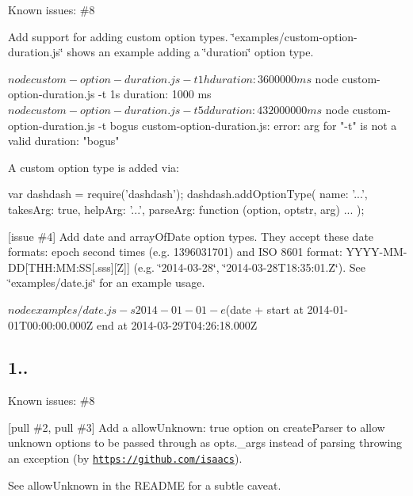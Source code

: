 \begin{DoxyItemize}
\item Known issues\+: \#8
\item Add support for adding custom option types. \char`\"{}examples/custom-\/option-\/duration.\+js\char`\"{} shows an example adding a \char`\"{}duration\char`\"{} option type. \begin{DoxyVerb}  $ node custom-option-duration.js -t 1h
  duration: 3600000 ms
  $ node custom-option-duration.js -t 1s
  duration: 1000 ms
  $ node custom-option-duration.js -t 5d
  duration: 432000000 ms
  $ node custom-option-duration.js -t bogus
  custom-option-duration.js: error: arg for "-t" is not a valid duration: "bogus"
\end{DoxyVerb}


A custom option type is added via\+: \begin{DoxyVerb}  var dashdash = require('dashdash');
  dashdash.addOptionType({
      name: '...',
      takesArg: true,
      helpArg: '...',
      parseArg: function (option, optstr, arg) {
          ...
      }
  });
\end{DoxyVerb}

\item \mbox{[}issue \#4\mbox{]} Add {\ttfamily date} and {\ttfamily array\+Of\+Date} option types. They accept these date formats\+: epoch second times (e.\+g. 1396031701) and I\+SO 8601 format\+: {\ttfamily Y\+Y\+Y\+Y-\/\+M\+M-\/\+DD\mbox{[}T\+H\+H\+:\+MM\+:SS\mbox{[}.sss\mbox{]}\mbox{[}Z\mbox{]}\mbox{]}} (e.\+g. \char`\"{}2014-\/03-\/28\char`\"{}, \char`\"{}2014-\/03-\/28\+T18\+:35\+:01.\+Z\char`\"{}). See \char`\"{}examples/date.\+js\char`\"{} for an example usage. \begin{DoxyVerb}  $ node examples/date.js -s 2014-01-01 -e $(date +%
  start at 2014-01-01T00:00:00.000Z
  end at 2014-03-29T04:26:18.000Z
\end{DoxyVerb}

\end{DoxyItemize}

\subsection*{1..}


\begin{DoxyItemize}
\item Known issues\+: \#8
\item \mbox{[}pull \#2, pull \#3\mbox{]} Add a {\ttfamily allow\+Unknown\+: true} option on {\ttfamily create\+Parser} to allow unknown options to be passed through as {\ttfamily opts.\+\_\+args} instead of parsing throwing an exception (by \href{https://github.com/isaacs}{\tt https\+://github.\+com/isaacs}).

See \textquotesingle{}allow\+Unknown\textquotesingle{} in the R\+E\+A\+D\+ME for a subtle caveat.
\end{DoxyItemize}


